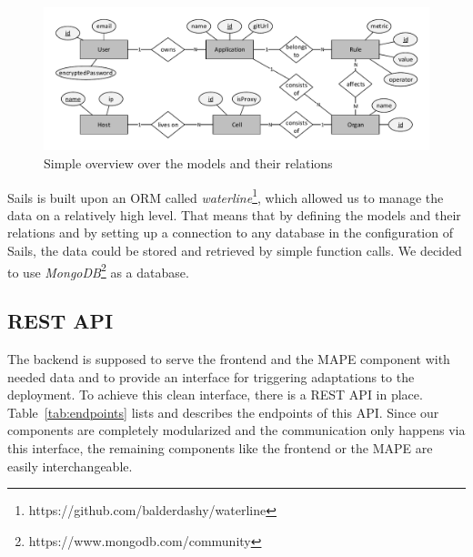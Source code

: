 \documentclass{seal_thesis}
\begin{document}
\begin{figure}[!ht]
\centering
	\includegraphics[width=\textwidth]{models-overview.pdf}
	\caption{Simple overview over the models and their relations}
	\label{fig:models}
\end{figure}

Sails is built upon an ORM called \textit{waterline}\footnote{https://github.com/balderdashy/waterline}, which allowed us to manage the data on a relatively high level.
That means that by defining the models and their relations and by setting up a connection to any database in the configuration of Sails, the data could be stored and retrieved by simple function calls.
We decided to use \textit{MongoDB}\footnote{https://www.mongodb.com/community} as a database.

\subsection{REST API}
The backend is supposed to serve the frontend and the MAPE component with needed data and to provide an interface for triggering adaptations to the deployment.
To achieve this clean interface, there is a REST API in place. Table~\ref{tab:endpoints} lists and describes the endpoints of this API.
Since our components are completely modularized and the communication only happens via this interface, the remaining components like the frontend or the MAPE are easily interchangeable.
\end{document}
